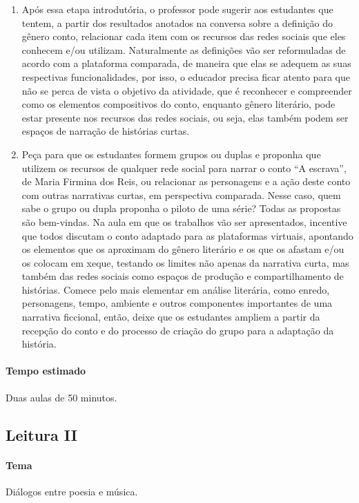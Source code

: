 \documentclass[12pt]{extarticle}
\begin{document}
\begin{enumerate}
\item
Após essa etapa introdutória, o professor pode sugerir aos estudantes
que tentem, a partir dos resultados anotados na conversa sobre a
definição do gênero conto, relacionar cada item com os recursos das
redes sociais que eles conhecem e/ou utilizam. Naturalmente as
definições vão ser reformuladas de acordo com a plataforma comparada, de
maneira que elas se adequem as suas respectivas funcionalidades, por
isso, o educador precisa ficar atento para que não se perca de vista o
objetivo da atividade, que é reconhecer e compreender como os elementos
compositivos do conto, enquanto gênero literário, pode estar presente
nos recursos das redes sociais, ou seja, elas também podem ser espaços
de narração de histórias curtas.

\item
Peça para que os estudantes formem grupos ou duplas e proponha que
utilizem os recursos de qualquer rede social para narrar o conto ``A
escrava'', de Maria Firmina dos Reis, ou relacionar as personagens e a
ação deste conto com outras narrativas curtas, em perspectiva comparada.
Nesse caso, quem sabe o grupo ou dupla proponha o piloto de uma série?
Todas as propostas são bem-vindas. Na aula em que os trabalhos vão ser
apresentados, incentive que todos discutam o conto adaptado para as
plataformas virtuais, apontando os elementos que os aproximam do gênero
literário e os que os afastam e/ou os colocam em xeque, testando os
limites não apenas da narrativa curta, mas também das redes sociais como
espaços de produção e compartilhamento de histórias. Comece pelo mais
elementar em análise literária, como enredo, personagens, tempo,
ambiente e outros componentes importantes de uma narrativa ficcional,
então, deixe que os estudantes ampliem a partir da recepção do conto e
do processo de criação do grupo para a adaptação da história.
\end{enumerate}

\paragraph{Tempo estimado} Duas aulas de 50 minutos.

\subsection{Leitura II}

\paragraph{Tema} Diálogos entre poesia e música.
\end{document}
